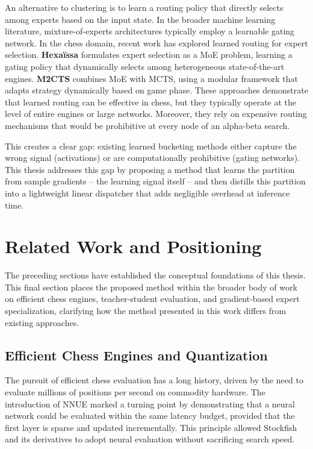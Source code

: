 
An alternative to clustering is to learn a routing policy that directly selects among experts based on the input state. In the broader machine learning literature, mixture-of-experts architectures typically employ a learnable gating network. In the chess domain, recent work has explored learned routing for expert selection. \textbf{Hexa\"issa} \parencite{ngo2026} formulates expert selection as a MoE problem, learning a gating policy that dynamically selects among heterogeneous state-of-the-art engines. \textbf{M2CTS} \parencite{helfenstein2024} combines MoE with MCTS, using a modular framework that adapts strategy dynamically based on game phase. These approaches demonstrate that learned routing can be effective in chess, but they typically operate at the level of entire engines or large networks. Moreover, they rely on expensive routing mechanisms that would be prohibitive at every node of an alpha-beta search.

This creates a clear gap: existing learned bucketing methods either capture the wrong signal (activations) or are computationally prohibitive (gating networks). This thesis addresses this gap by proposing a method that learns the partition from sample gradients -- the learning signal itself -- and then distills this partition into a lightweight linear dispatcher that adds negligible overhead at inference time.

\section{Related Work and Positioning}

The preceding sections have established the conceptual foundations of this thesis. This final section places the proposed method within the broader body of work on efficient chess engines, teacher-student evaluation, and gradient-based expert specialization, clarifying how the method presented in this work differs from existing approaches.

\subsection{Efficient Chess Engines and Quantization}
The pursuit of efficient chess evaluation has a long history, driven by the need to evaluate millions of positions per second on commodity hardware. The introduction of NNUE marked a turning point by demonstrating that a neural network could be evaluated within the same latency budget, provided that the first layer is sparse and updated incrementally. This principle allowed Stockfish and its derivatives to adopt neural evaluation without sacrificing search speed.

